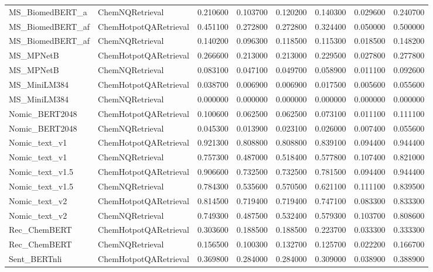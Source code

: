 {\begin{longtable}{llrrrrrr}
MS\_BiomedBERT\_a & ChemNQRetrieval & 0.210600 & 0.103700 & 0.120200 & 0.140300 & 0.029600 & 0.240700 \\
MS\_BiomedBERT\_af & ChemHotpotQARetrieval & 0.451100 & 0.272800 & 0.272800 & 0.324400 & 0.050000 & 0.500000 \\
MS\_BiomedBERT\_af & ChemNQRetrieval & 0.140200 & 0.096300 & 0.118500 & 0.115300 & 0.018500 & 0.148200 \\
MS\_MPNetB & ChemHotpotQARetrieval & 0.266600 & 0.213000 & 0.213000 & 0.229500 & 0.027800 & 0.277800 \\
MS\_MPNetB & ChemNQRetrieval & 0.083100 & 0.047100 & 0.049700 & 0.058900 & 0.011100 & 0.092600 \\
MS\_MiniLM384 & ChemHotpotQARetrieval & 0.038700 & 0.006900 & 0.006900 & 0.017500 & 0.005600 & 0.055600 \\
MS\_MiniLM384 & ChemNQRetrieval & 0.000000 & 0.000000 & 0.000000 & 0.000000 & 0.000000 & 0.000000 \\
Nomic\_BERT2048 & ChemHotpotQARetrieval & 0.100600 & 0.062500 & 0.062500 & 0.073100 & 0.011100 & 0.111100 \\
Nomic\_BERT2048 & ChemNQRetrieval & 0.045300 & 0.013900 & 0.023100 & 0.026000 & 0.007400 & 0.055600 \\
Nomic\_text\_v1 & ChemHotpotQARetrieval & 0.921300 & 0.808800 & 0.808800 & 0.839100 & 0.094400 & 0.944400 \\
Nomic\_text\_v1 & ChemNQRetrieval & 0.757300 & 0.487000 & 0.518400 & 0.577800 & 0.107400 & 0.821000 \\
Nomic\_text\_v1.5 & ChemHotpotQARetrieval & 0.906600 & 0.732500 & 0.732500 & 0.781500 & 0.094400 & 0.944400 \\
Nomic\_text\_v1.5 & ChemNQRetrieval & 0.784300 & 0.535600 & 0.570500 & 0.621100 & 0.111100 & 0.839500 \\
Nomic\_text\_v2 & ChemHotpotQARetrieval & 0.814500 & 0.719400 & 0.719400 & 0.747100 & 0.083300 & 0.833300 \\
Nomic\_text\_v2 & ChemNQRetrieval & 0.749300 & 0.487500 & 0.532400 & 0.579300 & 0.103700 & 0.808600 \\
Rec\_ChemBERT & ChemHotpotQARetrieval & 0.303600 & 0.188500 & 0.188500 & 0.223700 & 0.033300 & 0.333300 \\
Rec\_ChemBERT & ChemNQRetrieval & 0.156500 & 0.100300 & 0.132700 & 0.125700 & 0.022200 & 0.166700 \\
Sent\_BERTnli & ChemHotpotQARetrieval & 0.369800 & 0.284000 & 0.284000 & 0.309000 & 0.038900 & 0.388900 \\

\end{longtable}}
